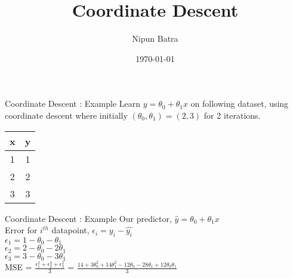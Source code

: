 \documentclass{beamer}
\title{Coordinate Descent}
\date{\today}
\author{Nipun Batra}
\institute{IIT Gandhinagar}
\begin{document}
\maketitle


	\begin{frame}{Coordinate Descent : Example}
Learn $y = \theta_0 + \theta_1 x$ on following dataset, using coordinate descent where initially $(\theta_0, \theta_1) = (2,3)$ for 2 iterations. 
\begin{table}[]
	\centering
	\label{tab:my-table}
	\begin{tabular}{|c|c|}
		\hline
		\textbf{x} & \textbf{y} \\ \hline
		1 & 1 \\ \hline
		2 & 2 \\ \hline
		3 & 3 \\ \hline
	\end{tabular}
\end{table}
\end{frame}

\begin{frame}{Coordinate Descent : Example}
Our predictor, $\hat{y} = \theta_0 + \theta_1x$\\
\vspace{1cm}
Error for $i^{th}$ datapoint, $\epsilon_i = y_i - \hat{y_i}$\\
$\epsilon_1 = 1 - \theta_0 - \theta_1$ \\
$\epsilon_2 = 2 - \theta_0 - 2\theta_1$ \\
$\epsilon_3 = 3 - \theta_0 - 3\theta_1$ \\

\vspace{1cm}
MSE = $\frac{\epsilon_1^2 + \epsilon_2^2 + \epsilon_3^2}{3}$ = $\frac{14 + 3\theta_0^2 + 14\theta_1^2 -12\theta_0 - 28\theta_1 + 12\theta_0\theta_1}{3}$\\
\end{frame}
\end{document}
